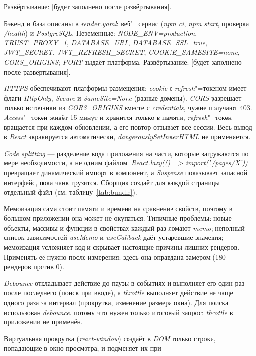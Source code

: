 \documentclass{stp}
\newcommand{\en}[1]{\textit{#1}}
\begin{document}
\begin{stpnum}
    Развёртывание: [будет заполнено после развёртывания].
  \item Бэкенд и база описаны в \en{render.yaml}: веб"=сервис
    (\en{npm ci}, \en{npm start}, проверка \en{/health}) и \en{PostgreSQL}.
    Переменные: \en{NODE\_ENV=production}, \en{TRUST\_PROXY=1},
    \en{DATABASE\_URL}, \en{DATABASE\_SSL=true}, \en{JWT\_SECRET},
    \en{JWT\_REFRESH\_SECRET}, \en{COOKIE\_SAMESITE=none},
    \en{CORS\_ORIGINS}; \en{PORT} выдаёт платформа.
    Развёртывание: [будет заполнено после развёртывания].
  \item \en{HTTPS} обеспечивают платформы размещения; \en{cookie} с
    \en{refresh}"=токеном имеет флаги \en{HttpOnly}, \en{Secure} и
    \en{SameSite=None} (разные домены). \en{CORS} разрешает только
    источники из \en{CORS\_ORIGINS} вместе с \en{credentials}, чужие
    получают 403. \en{Access}"=токен живёт 15 минут и хранится только в
    памяти, \en{refresh}"=токен вращается при каждом обновлении, а его
    повтор отзывает все сессии. Весь вывод в \en{React} экранируется
    автоматически, \en{dangerouslySetInnerHTML} не применяется.
  \item \en{Code splitting} --- разделение кода приложения на части,
    которые загружаются по мере необходимости, а не одним файлом.
    \en{React.lazy(() => import('./pages/X'))} превращает динамический
    импорт в компонент, а \en{Suspense} показывает запасной интерфейс,
    пока чанк грузится. Сборщик создаёт для каждой страницы отдельный
    файл (см. таблицу~\ref{tab:bundle}).
  \item Мемоизация сама стоит памяти и времени на сравнение свойств, поэтому
    в большом приложении она может не окупаться. Типичные проблемы:
    новые объекты, массивы и функции в свойствах каждый раз ломают
    \en{memo}; неполный список зависимостей \en{useMemo} и
    \en{useCallback} даёт устаревшие значения; мемоизация усложняет код и
    скрывает настоящие причины лишних рендеров. Применять её нужно после
    измерения: здесь она оправдана замером (180 рендеров против 0).
  \item \en{Debounce} откладывает действие до паузы в событиях и
    выполняет его один раз после последнего (поиск при вводе), а
    \en{throttle} выполняет действие не чаще одного раза за интервал
    (прокрутка, изменение размера окна). Для поиска использован
    \en{debounce}, потому что нужен только итоговый запрос; \en{throttle}
    в приложении не применён.
  \item Виртуальная прокрутка (\en{react-window}) создаёт в \en{DOM}
    только строки, попадающие в окно просмотра, и подменяет их при

\end{stpnum}
\end{document}
